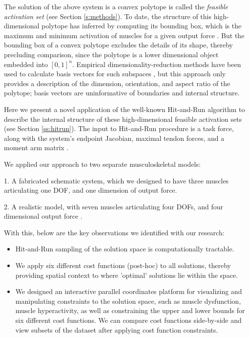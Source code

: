 The solution of the above system is a convex polytope is called the \emph{feasible activation set} (see Section \ref{s:methods}).
To date, the structure of this high-dimensional polytope has inferred by computing its bounding box, which is the maximum and minimum activation of muscles for a given output force \cite{kutch2011muscle,sohn2013cat_bounding_box,Valero-Cuevas2015high-dimensional}.
But the bounding box of a convex polytope excludes the details of its shape, thereby precluding comparison, since the polytope is a lower dimensional object embedded into $[0,1]^n$.
Empirical dimensionality-reduction methods have been used to calculate basis vectors for such subspaces \cite{Clewley2008Estimating,davella2005shared,krishnamoorthy2003muscle},
but this approach only provides a description of the dimension, orientation, and aspect ratio of the polytope; basis vectors are uninformative of boundaries and internal structure.

Here we present a novel application of the well-known Hit-and-Run algorithm \cite{smith1984efficient} to describe the internal structure of these high-dimensional feasible activation sets (see Section \ref{ss:hitrun}). The input to Hit-and-Run procedure is a task force, along with the system's endpoint Jacobian, maximal tendon forces, and a moment arm matrix \cite{Valero-Cuevas2009mathematical}.

We applied our approach to two separate musculoskeletal models:

1. A fabricated schematic system, which we designed to have three muscles articulating one DOF, and one dimension of output force.

2. A realistic model, with seven muscles articulating four DOFs, and four dimensional output force \cite{Valero-Cuevas1998Large}.

With this, below are the key observations we identified with our research:
\begin{itemize}
\item {Hit-and-Run sampling of the solution space is computationally tractable.}
\item {We apply six different cost functions (post-hoc) to all solutions, thereby providing spatial context to where 'optimal' solutions lie within the space.}
\item {We designed an interactive parallel coordinates platform for visualizing and manipulating constraints to the solution space, such as muscle dysfunction, muscle hyperactivity, as well as constraining the upper and lower bounds for six different cost functions. We can compare cost functions side-by-side and view subsets of the dataset after applying cost function constraints. }
\end{itemize}

